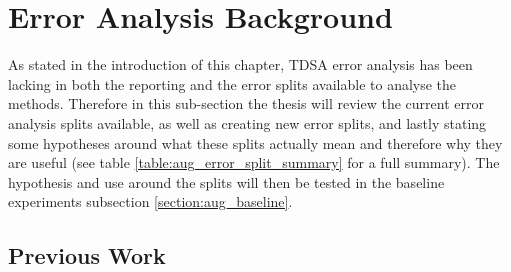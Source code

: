 \section{Error Analysis Background}
\label{section:aug_error_analysis}
As stated in the introduction of this chapter, TDSA error analysis has been lacking in both the reporting and the error splits available to analyse the methods. Therefore in this sub-section the thesis will review the current error analysis splits available, as well as creating new error splits, and lastly stating some hypotheses around what these splits actually mean and therefore why they are useful (see table \ref{table:aug_error_split_summary} for a full summary). The hypothesis and use around the splits will then be tested in the baseline experiments subsection \ref{section:aug_baseline}.

\subsection{Previous Work}
\label{section:aug_error_analysis_previous_work}

